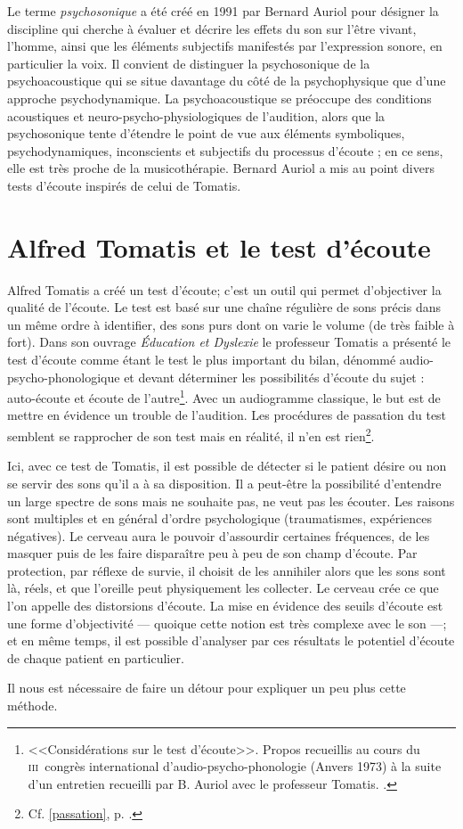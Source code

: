 Le terme \emph{psychosonique} a été créé en 1991 par Bernard Auriol pour
désigner la discipline qui cherche à évaluer et décrire les effets du
son sur l'être vivant, l'homme, ainsi que les éléments
subjectifs manifestés par l'expression sonore, en particulier la voix.
Il convient de distinguer la psychosonique de la psychoacoustique qui
se situe davantage du côté de la psychophysique que d'une approche
psychodynamique. La psychoacoustique se préoccupe des conditions
acoustiques et neuro-psycho-physiologiques de l'audition, alors que la
psychosonique tente d'étendre le point de vue aux éléments
symboliques, psychodynamiques, inconscients et subjectifs du processus
d'écoute ;  en ce sens, elle est très proche de la musicothérapie.
Bernard Auriol a mis au point divers tests d'écoute inspirés de celui de Tomatis.
  
\section{Alfred Tomatis et le test d'écoute}
  Alfred Tomatis a créé un test d'écoute; c'est un outil qui permet d'objectiver la qualité de l'écoute.
  Le test est  basé sur une chaîne régulière de sons précis dans un même ordre à identifier, des sons purs dont on varie le volume (de très faible à fort). Dans son ouvrage \emph{Éducation et Dyslexie}\autocite{tomatis:education} le professeur Tomatis
  a présenté le test d'écoute comme étant le test le plus important du
  bilan, dénommé audio-psycho-phonologique et devant déterminer les
  possibilités d'écoute du sujet : auto-écoute et écoute de
  l'autre\footnote{<<Considérations sur le test d'écoute>>. Propos
  	recueillis au cours du \textsc{iii}\ieme\ congrès international
  	d'audio-psycho-phonologie (Anvers 1973) à la suite d'un entretien recueilli par B. Auriol
  	avec le professeur Tomatis. \autocite{auriol_stress}.}. 
  Avec un audiogramme classique, le but est de mettre en évidence un trouble de l'audition. Les procédures de passation du test semblent se rapprocher de son test mais en réalité, il n'en est rien\footnote{Cf. \ref{passation}, p. 
  \pageref{passation}.}.
  
  Ici, avec ce test de Tomatis, il est possible de détecter si le patient désire ou non se servir des sons
  qu'il a à sa disposition. Il a peut-être la possibilité d'entendre un large spectre de
  sons mais ne souhaite pas, ne veut pas les écouter. Les raisons sont multiples et en général d'ordre psychologique (traumatismes,
  expériences négatives). Le cerveau aura le
  pouvoir d'assourdir certaines fréquences, de les masquer puis de les faire disparaître peu à peu de
  son champ d'écoute. Par protection, par réflexe de survie, il choisit de les
  annihiler alors que les sons sont là, réels, et que  l'oreille peut physiquement les collecter. Le cerveau crée ce
  que l'on appelle des distorsions d'écoute\autocite{tomatis:education}.
La mise en évidence des seuils d'écoute est une forme d'objectivité --- quoique cette notion est très complexe avec le son ---; et en même temps,  il est possible d'analyser par ces résultats le potentiel d'écoute de chaque patient en particulier.


Il nous est nécessaire de faire un détour pour expliquer un peu plus cette méthode.
  

